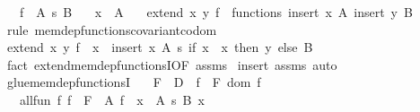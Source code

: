 \begin{isabellebody}
\ \ \ {\isachardoublequoteopen}f\ {\isasymin}\ A\ {\isasymrightarrow}s\ B{\isachardoublequoteclose}\isanewline
\ \ \ {\isachardoublequoteopen}x\ {\isasymnotin}\ A{\isachardoublequoteclose}\isanewline
\ \ \ {\isachardoublequoteopen}extend\ x\ y\ f\ {\isasymin}\ functions\ {\isacharparenleft}{\kern0pt}insert\ x\ A{\isacharparenright}{\kern0pt}\ {\isacharparenleft}{\kern0pt}insert\ y\ B{\isacharparenright}{\kern0pt}{\isachardoublequoteclose}\isanewline
%
\isadelimproof
%
\endisadelimproof
%
\isatagproof
{}\isamarkupfalse%
\ {\isacharparenleft}{\kern0pt}rule\ mem{\isacharunderscore}{\kern0pt}dep{\isacharunderscore}{\kern0pt}functions{\isacharunderscore}{\kern0pt}covariant{\isacharunderscore}{\kern0pt}codom{\isacharparenright}{\kern0pt}\isanewline
\ \ \isamarkupfalse%
\ {\isachardoublequoteopen}extend\ x\ y\ f\ {\isasymin}\ {\isacharparenleft}{\kern0pt}x{\isacharprime}{\kern0pt}\ {\isasymin}\ insert\ x\ A{\isacharparenright}{\kern0pt}\ {\isasymrightarrow}s\ {\isacharparenleft}{\kern0pt}if\ x{\isacharprime}{\kern0pt}\ {\isacharequal}{\kern0pt}\ x\ then\ {\isacharbraceleft}{\kern0pt}y{\isacharbraceright}{\kern0pt}\ else\ B{\isacharparenright}{\kern0pt}{\isachardoublequoteclose}\isanewline
\ \ \ \ \isamarkupfalse%
\ {\isacharparenleft}{\kern0pt}fact\ extend{\isacharunderscore}{\kern0pt}mem{\isacharunderscore}{\kern0pt}dep{\isacharunderscore}{\kern0pt}functionsI{\isacharbrackleft}{\kern0pt}OF\ assms{\isacharbrackright}{\kern0pt}{\isacharparenright}{\kern0pt}\isanewline
{}\isamarkupfalse%
\ {\isacharparenleft}{\kern0pt}insert\ assms{\isacharcomma}{\kern0pt}\ auto{\isacharparenright}{\kern0pt}%
\endisatagproof
{\isafoldproof}%
%
\isadelimproof
%
\endisadelimproof
%
\isadelimdocument
%
\endisadelimdocument
%
\isatagdocument
%
\isamarkuptrue%
%
\endisatagdocument
{\isafolddocument}%
%
\isadelimdocument
%
\endisadelimdocument
{}\isamarkupfalse%
\ glue{\isacharunderscore}{\kern0pt}mem{\isacharunderscore}{\kern0pt}dep{\isacharunderscore}{\kern0pt}functionsI{\isacharcolon}{\kern0pt}\isanewline
\ \ \ F\ \ {\isachardoublequoteopen}D\ {\isasymequiv}\ {\isasymUnion}f\ {\isasymin}\ F{\isachardot}{\kern0pt}\ dom\ f{\isachardoublequoteclose}\isanewline
\ \ \ all{\isacharunderscore}{\kern0pt}fun{\isacharcolon}{\kern0pt}\ {\isachardoublequoteopen}{\isasymAnd}f{\isachardot}{\kern0pt}\ f\ {\isasymin}\ F\ {\isasymLongrightarrow}\ {\isasymexists}A{\isachardot}{\kern0pt}\ f\ {\isasymin}\ {\isacharparenleft}{\kern0pt}x\ {\isasymin}\ A{\isacharparenright}{\kern0pt}\ {\isasymrightarrow}s\ B\ x{\isachardoublequoteclose}\isanewline

\end{isabellebody}
